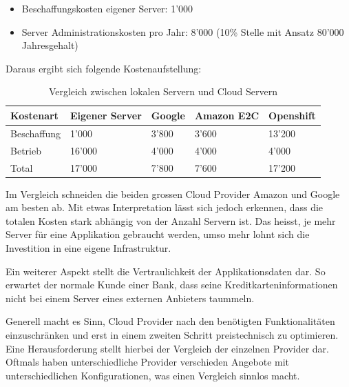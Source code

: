 \documentclass[12pt,a4paper]{article}
\begin{document}
\begin{itemize}
	\item Beschaffungskosten eigener Server: 1'000
	\item Server Administrationskosten pro Jahr: 8'000 (10\% Stelle mit Ansatz 80'000 Jahresgehalt)
\end{itemize}

Daraus ergibt sich folgende Kostenaufstellung:

\begin{table}[H]
    \begin{tabular}{| l | l | l | l | l |}
		\hline
        Kostenart & Eigener Server & Google & Amazon E2C & Openshift \\ \hline
        Beschaffung & 1'000 & 3'800 & 3'600 & 13'200\\
        Betrieb & 16'000 & 4'000 & 4'000 & 4'000\\
        Total & 17'000 & 7'800 & 7'600 & 17'200 \\ \hline
    \end{tabular}
    \caption{Vergleich zwischen lokalen Servern und Cloud Servern}
\end{table}

Im Vergleich schneiden die beiden grossen Cloud Provider Amazon und Google am besten ab. Mit etwas Interpretation lässt sich jedoch erkennen, dass die totalen Kosten stark abhängig von der Anzahl Servern ist.
Das heisst, je mehr Server für eine Applikation gebraucht werden, umso mehr lohnt sich die Investition in eine eigene Infrastruktur.

Ein weiterer Aspekt stellt die Vertraulichkeit der Applikationsdaten dar. So erwartet der normale Kunde einer Bank, dass seine Kreditkarteninformationen nicht bei einem Server eines externen Anbieters taummeln.

Generell macht es Sinn, Cloud Provider nach den benötigten Funktionalitäten einzuschränken und erst in einem zweiten Schritt preistechnisch zu optimieren. Eine Herausforderung stellt hierbei der Vergleich der einzelnen Provider dar.
Oftmals haben unterschiedliche Provider verschieden Angebote mit unterschiedlichen Konfigurationen, was einen Vergleich sinnlos macht.
\end{document}
